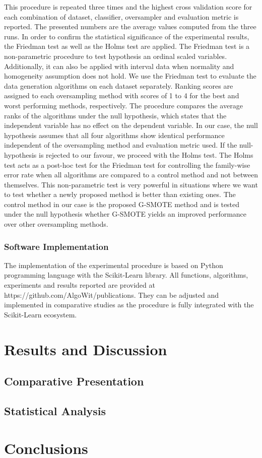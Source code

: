 \documentclass[parskip=full]{scrartcl}
\begin{document}
This procedure is repeated three times and the highest cross validation score for each combination of dataset, classifier, oversampler and evaluation metric is reported. The presented numbers are the average values computed from the three runs. In order to confirm the statistical significance of the experimental results, the Friedman test \cite{Sheldon.1996} as well as the Holms test \cite{JanezDemsar.2006} are applied. The Friedman test is a non-parametric procedure to test hypothesis an ordinal scaled variables. Additionally, it can also be applied with interval data when normality and homogeneity assumption does not hold. We use the Friedman test to evaluate the data generation algorithms on each dataset separately. Ranking scores are assigned to each oversampling method with scores of 1 to 4 for the best and worst performing methods, respectively. The procedure compares the average ranks of the algorithms under the null hypothesis, which states that the independent variable has no effect on the dependent variable. In our case, the null hypothesis assumes that all four algorithms show identical performance independent of the oversampling method and evaluation metric used. If the null-hypothesis is rejected to our favour, we proceed with the Holms test. The Holms test acts as a post-hoc test for the Friedman test for controlling the family-wise error rate when all algorithms are compared to a control method and not between themselves. This non-parametric test is very powerful in situations where we want to test whether a newly proposed method is better than existing ones. The control method in our case is the proposed G-SMOTE method and is tested under the null hypothesis whether G-SMOTE yields an improved performance over other oversampling methods.

\subsubsection{Software Implementation}

The implementation of the experimental procedure is based on Python programming language with the Scikit-Learn \cite{PedregosaF.VaroquauxG.GramfortA.MichelV.ThirionB.GriselO.BlondelM.Prette.2011} library. All functions, algorithms, experiments and results reported are provided at https://github.com/AlgoWit/publications. They can be adjusted and implemented in comparative studies as the procedure is fully integrated with the Scikit-Learn ecosystem.    

\section{Results and Discussion}
\subsection{Comparative Presentation}
\subsection{Statistical Analysis}

\section{Conclusions}



\end{document}
